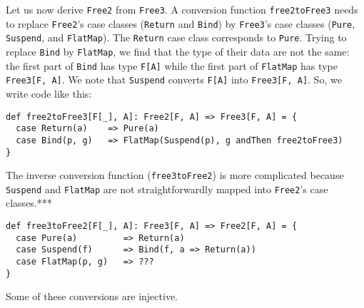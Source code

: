 Let us now derive \lstinline!Free2!
from \lstinline!Free3!.
A conversion function \lstinline!free2toFree3!
needs to replace \lstinline!Free2!\textsf{'}s
case classes (\lstinline!Return!
and \lstinline!Bind!) by
\lstinline!Free3!\textsf{'}s case
classes (\lstinline!Pure!,
\lstinline!Suspend!, and
\lstinline!FlatMap!). The
\lstinline!Return! case
class corresponds to \lstinline!Pure!.
Trying to replace \lstinline!Bind!
by \lstinline!FlatMap!,
we find that the type of their data are not the same: the first part
of \lstinline!Bind! has
type \lstinline!F[A]! while
the first part of \lstinline!FlatMap!
has type \lstinline!Free3[F, A]!.
We note that \lstinline!Suspend!
converts \lstinline!F[A]!
into \lstinline!Free3[F, A]!.
So, we write code like this:
\begin{lstlisting}
def free2toFree3[F[_], A]: Free2[F, A] => Free3[F, A] = {
  case Return(a)    => Pure(a)
  case Bind(p, g)   => FlatMap(Suspend(p), g andThen free2toFree3)
}
\end{lstlisting}
The inverse conversion function (\lstinline!free3toFree2!)
is more complicated because \lstinline!Suspend!
and \lstinline!FlatMap!
are not straightforwardly mapped into \lstinline!Free2!\textsf{'}s
case classes.{*}{*}{*}
\begin{lstlisting}
def free3toFree2[F[_], A]: Free3[F, A] => Free2[F, A] = {
  case Pure(a)         => Return(a)
  case Suspend(f)      => Bind(f, a => Return(a))
  case FlatMap(p, g)   => ???
}
\end{lstlisting}
Some of these conversions are injective.

